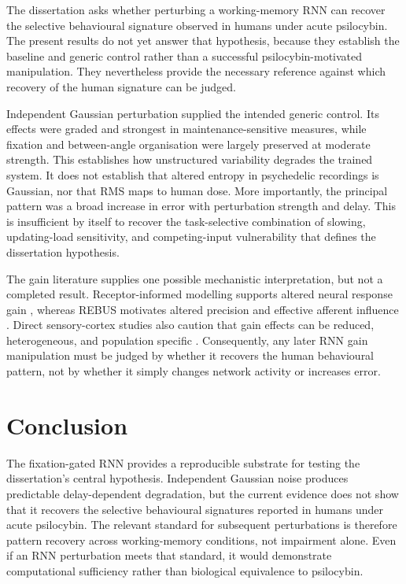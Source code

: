 \documentclass[12pt,a4paper]{article}
\begin{document}
The dissertation asks whether perturbing a working-memory RNN can recover the
selective behavioural signature observed in humans under acute psilocybin.
The present results do not yet answer that hypothesis, because they establish
the baseline and generic control rather than a successful
psilocybin-motivated manipulation. They nevertheless provide the necessary
reference against which recovery of the human signature can be judged.

Independent Gaussian perturbation supplied the intended generic control. Its
effects were graded and strongest in maintenance-sensitive measures, while
fixation and between-angle organisation were largely preserved at moderate
strength. This establishes how unstructured variability degrades the trained
system. It does not establish that altered entropy in psychedelic recordings
is Gaussian, nor that RMS maps to human dose. More importantly, the principal
pattern was a broad increase in error with perturbation strength and delay.
This is insufficient by itself to recover the task-selective combination of
slowing, updating-load sensitivity, and competing-input vulnerability that
defines the dissertation hypothesis.

The gain literature supplies one possible mechanistic interpretation, but not
a completed result. Receptor-informed modelling supports altered neural
response gain \citep{herzog2023mechanistic}, whereas REBUS motivates altered
precision and effective afferent influence
\citep{carhartharris2019rebus}. Direct sensory-cortex studies also caution that
gain effects can be reduced, heterogeneous, and population specific
\citep{michaiel2019visualgain,barzan2024gaincontrol}. Consequently, any later
RNN gain manipulation must be judged by whether it recovers the human
behavioural pattern, not by whether it simply changes network activity or
increases error.

\section{Conclusion}

The fixation-gated RNN provides a reproducible substrate for testing the
dissertation's central hypothesis. Independent Gaussian noise produces
predictable delay-dependent degradation, but the current evidence does not
show that it recovers the selective behavioural signatures reported in humans
under acute psilocybin. The relevant standard for subsequent perturbations is
therefore pattern recovery across working-memory conditions, not impairment
alone. Even if an RNN perturbation meets that standard, it would demonstrate
computational sufficiency rather than biological equivalence to psilocybin.


\end{document}
